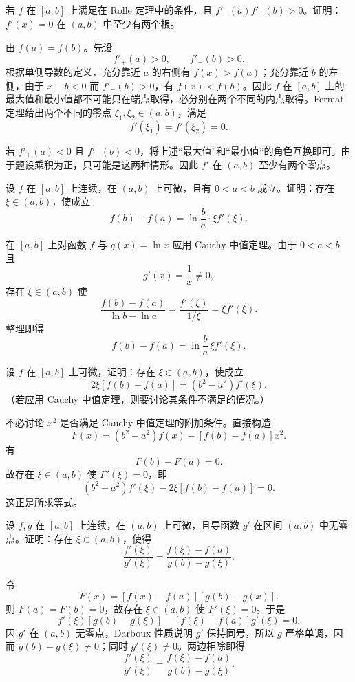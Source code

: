 \begin{xexercise}[2]
若 $f$ 在 $[a,b]$ 上满足在 Rolle 定理中的条件，且 $f'_+(a)f'_-(b)>0$。证明：$f'(x)=0$ 在 $(a,b)$ 中至少有两个根。
\end{xexercise}
\begin{xsolution}
由 $f(a)=f(b)$。先设
\[
  f'_+(a)>0,\qquad f'_-(b)>0.
\]
根据单侧导数的定义，充分靠近 $a$ 的右侧有 $f(x)>f(a)$；充分靠近 $b$ 的左侧，由于 $x-b<0$ 而 $f'_-(b)>0$，有 $f(x)<f(b)$。因此 $f$ 在 $[a,b]$ 上的最大值和最小值都不可能只在端点取得，必分别在两个不同的内点取得。Fermat 定理给出两个不同的零点 $\xi_1,\xi_2\in(a,b)$，满足
\[
  f'(\xi_1)=f'(\xi_2)=0.
\]

若 $f'_+(a)<0$ 且 $f'_-(b)<0$，将上述“最大值”和“最小值”的角色互换即可。由于题设乘积为正，只可能是这两种情形。因此 $f'$ 在 $(a,b)$ 至少有两个零点。
\end{xsolution}


\begin{xexercise}[3]
设 $f$ 在 $[a,b]$ 上连续，在 $(a,b)$ 上可微，且有 $0<a<b$ 成立。证明：存在 $\xi\in(a,b)$，使成立
\[
  f(b)-f(a)=\ln\frac{b}{a}\cdot\xi f'(\xi).
\]
\end{xexercise}
\begin{xsolution}
在 $[a,b]$ 上对函数 $f$ 与 $g(x)=\ln x$ 应用 Cauchy 中值定理。由于 $0<a<b$ 且
\[
  g'(x)=\frac1x\neq0,
\]
存在 $\xi\in(a,b)$ 使
\[
  \frac{f(b)-f(a)}{\ln b-\ln a}
  =\frac{f'(\xi)}{1/\xi}=\xi f'(\xi).
\]
整理即得
\[
  f(b)-f(a)=\ln\frac ba\,\xi f'(\xi).
\]
\end{xsolution}


\begin{xexercise}[4]
设 $f$ 在 $[a,b]$ 上可微，证明：存在 $\xi\in(a,b)$，使成立
\[
  2\xi[f(b)-f(a)]=(b^2-a^2)f'(\xi).
\]
（若应用 Cauchy 中值定理，则要讨论其条件不满足的情况。）
\end{xexercise}
\begin{xsolution}
不必讨论 $x^2$ 是否满足 Cauchy 中值定理的附加条件。直接构造
\[
  F(x)=(b^2-a^2)f(x)-[f(b)-f(a)]x^2.
\]
有
\[
  F(b)-F(a)=0.
\]
故存在 $\xi\in(a,b)$ 使 $F'(\xi)=0$，即
\[
  (b^2-a^2)f'(\xi)-2\xi[f(b)-f(a)]=0.
\]
这正是所求等式。
\end{xsolution}


\begin{xexercise}[5]
设 $f,g$ 在 $[a,b]$ 上连续，在 $(a,b)$ 上可微，且导函数 $g'$ 在区间 $(a,b)$ 中无零点。证明：存在 $\xi\in(a,b)$，使得
\[
  \frac{f'(\xi)}{g'(\xi)}=\frac{f(\xi)-f(a)}{g(b)-g(\xi)}.
\]
\end{xexercise}
\begin{xsolution}
令
\[
  F(x)=[f(x)-f(a)][g(b)-g(x)].
\]
则 $F(a)=F(b)=0$，故存在 $\xi\in(a,b)$ 使 $F'(\xi)=0$。于是
\[
  f'(\xi)[g(b)-g(\xi)]-[f(\xi)-f(a)]g'(\xi)=0.
\]
因 $g'$ 在 $(a,b)$ 无零点，Darboux 性质说明 $g'$ 保持同号，所以 $g$ 严格单调，因而 $g(b)-g(\xi)\neq0$；同时 $g'(\xi)\neq0$。两边相除即得
\[
  \frac{f'(\xi)}{g'(\xi)}
  =\frac{f(\xi)-f(a)}{g(b)-g(\xi)}.
\]
\end{xsolution}



